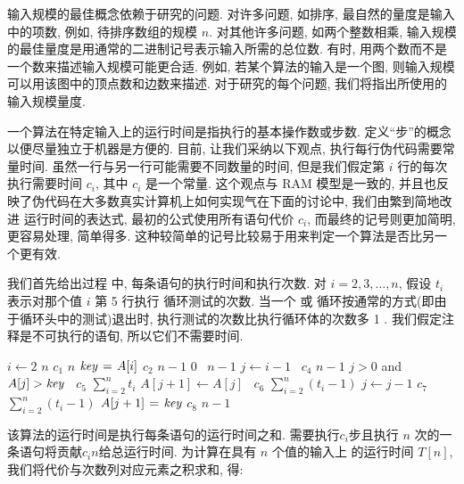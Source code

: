 \documentclass[oneside,10pt]{ctexbook}
\begin{document}
输入规模的最佳概念依赖于研究的问题. 对许多问题, 如排序, 最自然的量度是输入中的项数, 例如, 待排序数组的规模 $n$. 对其他许多问题, 如两个整数相乘, 输入规模的最佳量度是用通常的二进制记号表示输入所需的总位数. 有时, 用两个数而不是一个数来描述输入规模可能更合适. 例如, 若某个算法的输入是一个图, 则输入规模可以用该图中的顶点数和边数来描述. 对于研究的每个问题, 我们将指出所使用的输入规模量度.

一个算法在特定输入上的运行时间是指执行的基本操作数或步数. 定义``步''的概念以便尽量独立于机器是方便的. 目前, 让我们采纳以下观点, 执行每行伪代码需要常量时间. 虽然一行与另一行可能需要不同数量的时间, 但是我们假定第 $i$ 行的每次执行需要时间 $c_i$, 其中 $c_i$ 是一个常量. 这个观点与 RAM 模型是一致的, 并且也反映了伪代码在大多数真实计算机上如何实现气在下面的讨论中, 我们由繁到简地改进 运行时间的表达式, 最初的公式使用所有语句代价 $c_i$, 而最终的记号则更加简明, 更容易处理, 简单得多. 这种较简单的记号比较易于用来判定一个算法是否比另一个更有效.

我们首先给出过程  中, 每条语句的执行时间和执行次数. 对 $i=2, 3, \dots, n$, 假设 $t_i$ 表示对那个值 $i$ 第 5 行执行  循环测试的次数. 当一个  或  循环按通常的方式(即由于循环头中的测试)退出时, 执行测试的次数比执行循环体的次数多 1 . 我们假定注释是不可执行的语旬, 所以它们不需要时间.

\newcommand{\myquad}[1][1]{\hspace*{#1em}\ignorespaces}
\begin{codebox}
\Procname{$\proc{Insertion-Sort}(A, n) \myquad[16] \text{代价}$ \quad \text{次数}}
\li \For $i \gets 2$ \To $n$ \myquad[18] $c_1$ \quad\quad $n$
\li \Do
$\id{key} \gets A[i]$ \myquad[17]\; $c_2$ \quad\quad $n-1$
\li {} \; $0$ \quad\quad\ $n-1$
\li $j \gets i-1$ \myquad[18]\ $c_4$ \quad\quad $n-1$
\li \While $j > 0$ and $A[j] > \id{key}$ \myquad[10]\ $c_5$ \quad\;\; $\sum_{i=2}^{n}t_i$
\li \Do
$A[j+1] \gets A[j]$ \myquad[13]\ $c_6$ \; $\sum_{i=2}^{n}(t_i-1)$
\li $j \gets j-1$ \myquad[16] $c_7$ \; $\sum_{i=2}^{n}(t_i-1)$
\End
\li $A[j+1] \gets \id{key}$ \myquad[16] $c_8$ \quad\quad $n-1$
\End
\end{codebox}

该算法的运行时间是执行每条语句的运行时间之和. 需要执行$c_i$步且执行 $n$ 次的一条语句将贡献$c_in$给总运行时间. 为计算在具有 $n$ 个值的输入上  的运行时间 $T[n]$, 我们将代价与次数列对应元素之积求和, 得:
\end{document}
